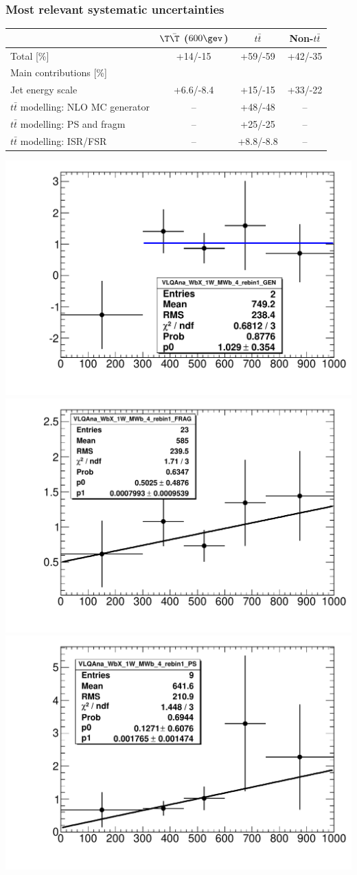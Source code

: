 \begin{frame}\frametitle{Most relevant systematic uncertainties}
\centering\footnotesize

\begin{tabular}{l*{3}{c}}
\toprule
 & $\T\bar{\T}$ ($600\gev$) & $t\bar{t}$ & Non-$t\bar{t}$\\
\midrule
Total [\%] & +14/-15 & +59/-59 & +42/-35\\
\midrule
Main contributions [\%] &&&\\
Jet energy scale & +6.6/-8.4 & +15/-15 & +33/-22\\  
$t\bar{t}$ modelling: NLO MC generator & -- & +48/-48 & --\\  
$t\bar{t}$ modelling: PS and fragm & -- & +25/-25 & --\\  
$t\bar{t}$ modelling: ISR/FSR & -- & +8.8/-8.8 & --\\   
\bottomrule
\end{tabular}

\includegraphics[width=.33\textwidth]{pics/GEN_RATIO.pdf}
\includegraphics[width=.33\textwidth]{pics/FRAG_RATIO.pdf}
\includegraphics[width=.33\textwidth]{pics/PS_RATIO.pdf}

\end{frame}

